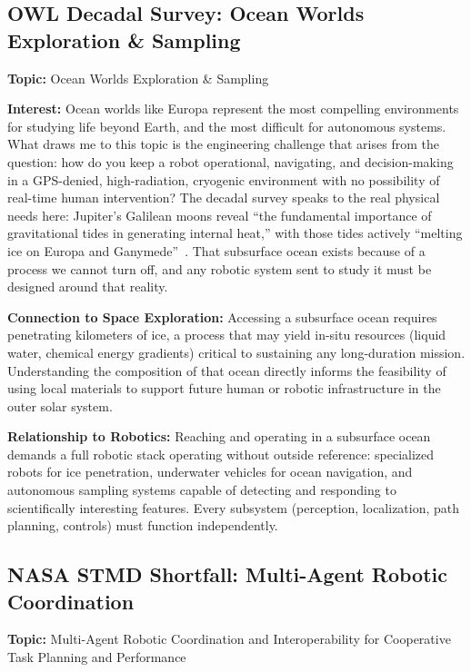 \documentclass[11pt]{article}
\begin{document}
\subsection{OWL Decadal Survey: Ocean Worlds Exploration \& Sampling}

\textbf{Topic:} Ocean Worlds Exploration \& Sampling~\cite[pp.~36--39]{owlDecadal}

\textbf{Interest:} Ocean worlds like Europa represent the most compelling environments
for studying life beyond Earth, and the most difficult for autonomous systems. What draws me to
this topic is the engineering challenge that arises from the question: how do you keep a robot
operational, navigating, and decision-making in a GPS-denied, high-radiation, cryogenic
environment with no possibility of real-time human intervention? The decadal survey speaks to
the real physical needs here: Jupiter's Galilean moons reveal ``the fundamental importance of
gravitational tides in generating internal heat,'' with those tides actively ``melting ice on
Europa and Ganymede''~\cite[p.~37]{owlDecadal}. That subsurface ocean exists because of a
process we cannot turn off, and any robotic system sent to study it must be designed around that
reality.

\textbf{Connection to Space Exploration:} Accessing a subsurface ocean requires
penetrating kilometers of ice, a process that may yield in-situ resources (liquid water,
chemical energy gradients) critical to sustaining any long-duration mission. Understanding the
composition of that ocean directly informs the feasibility of using local materials to support
future human or robotic infrastructure in the outer solar system.

\textbf{Relationship to Robotics:} Reaching and operating in a subsurface ocean demands
a full robotic stack operating without outside reference: specialized robots for ice
penetration, underwater vehicles for ocean navigation, and autonomous sampling systems capable of
detecting and responding to scientifically interesting features. Every subsystem (perception,
localization, path planning, controls) must function independently.

\subsection{NASA STMD Shortfall: Multi-Agent Robotic Coordination}

\textbf{Topic:} Multi-Agent Robotic Coordination and Interoperability for Cooperative
Task Planning and Performance~\cite{stmdShortfall}
\end{document}
